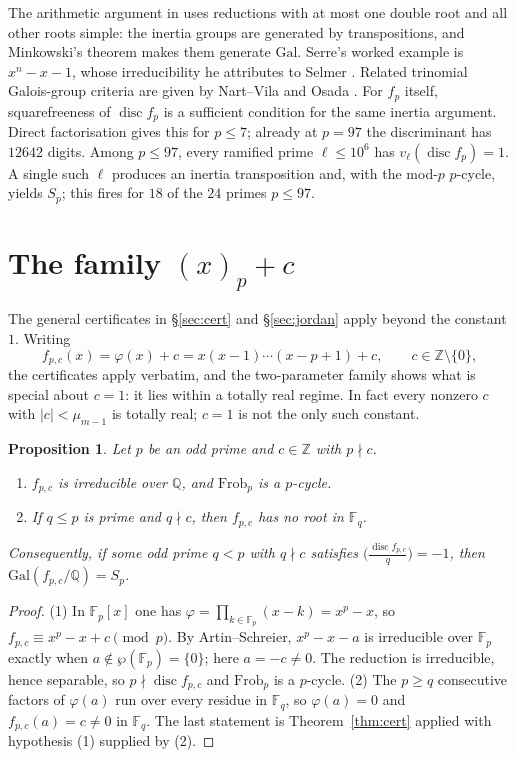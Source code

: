 \documentclass[11pt,a4paper]{amsart}
\newcommand{\F}{\mathbb{F}}
\newcommand{\Q}{\mathbb{Q}}
\newcommand{\Z}{\mathbb{Z}}
\newcommand{\Gal}{\mathrm{Gal}}
\newcommand{\disc}{\operatorname{disc}}
\newcommand{\Frob}{\mathrm{Frob}}
\theoremstyle{plain}
\newtheorem{proposition}[theorem]{Proposition}
\theoremstyle{definition}
\begin{document}
The arithmetic argument in \cite[Remark~2, pp.~42--43]{SerreTopics} uses reductions with at most one double root and all other roots simple: the inertia groups are generated by transpositions, and Minkowski's theorem makes them generate \(\Gal\). Serre's worked example is \(x^n-x-1\), whose irreducibility he attributes to Selmer \cite{Selmer}. Related trinomial Galois-group criteria are given by Nart--Vila \cite{NartVila} and Osada \cite{Osada}. For \(f_p\) itself, squarefreeness of \(\disc f_p\) is a sufficient condition for the same inertia argument. Direct factorisation gives this for \(p\le7\); already at \(p=97\) the discriminant has \(12642\) digits. Among \(p\le97\), every ramified prime \(\ell\le10^6\) has \(v_\ell(\disc f_p)=1\). A single such \(\ell\) produces an inertia transposition and, with the mod-\(p\) \(p\)-cycle, yields \(S_p\); this fires for \(18\) of the \(24\) primes \(p\le97\).

\section{The family \texorpdfstring{\((x)_p+c\)}{(x)\_p+c}}
\label{sec:family}

The general certificates in \S\ref{sec:cert} and \S\ref{sec:jordan} apply beyond the constant \(1\). Writing
\[
f_{p,c}(x)=\varphi(x)+c=x(x-1)\cdots(x-p+1)+c,\qquad c\in\Z\setminus\{0\},
\]
the certificates apply verbatim, and the two-parameter family shows what is special about \(c=1\): it lies within a totally real regime. In fact every nonzero \(c\) with \(\lvert c\rvert<\mu_{m-1}\) is totally real; \(c=1\) is not the only such constant.

\begin{proposition}
\label{prop:fpc}
Let \(p\) be an odd prime and \(c\in\Z\) with \(p\nmid c\).
\begin{enumerate}
\item \(f_{p,c}\) is irreducible over \(\Q\), and \(\Frob_p\) is a \(p\)-cycle.
\item If \(q\le p\) is prime and \(q\nmid c\), then \(f_{p,c}\) has no root in \(\F_q\).
\end{enumerate}
Consequently, if some odd prime \(q<p\) with \(q\nmid c\) satisfies \(\bigl(\frac{\disc f_{p,c}}{q}\bigr)=-1\), then \(\Gal(f_{p,c}/\Q)=S_p\).
\end{proposition}

\begin{proof}
(1) In \(\F_p[x]\) one has \(\varphi=\prod_{k\in\F_p}(x-k)=x^p-x\), so \(f_{p,c}\equiv x^p-x+c\pmod p\). By Artin--Schreier, \(x^p-x-a\) is irreducible over \(\F_p\) exactly when \(a\notin\wp(\F_p)=\{0\}\); here \(a=-c\ne0\). The reduction is irreducible, hence separable, so \(p\nmid\disc f_{p,c}\) and \(\Frob_p\) is a \(p\)-cycle.
(2) The \(p\ge q\) consecutive factors of \(\varphi(a)\) run over every residue in \(\F_q\), so \(\varphi(a)=0\) and \(f_{p,c}(a)=c\ne0\) in \(\F_q\).
The last statement is Theorem~\ref{thm:cert} applied with hypothesis (1) supplied by (2).
\end{proof}
\end{document}
